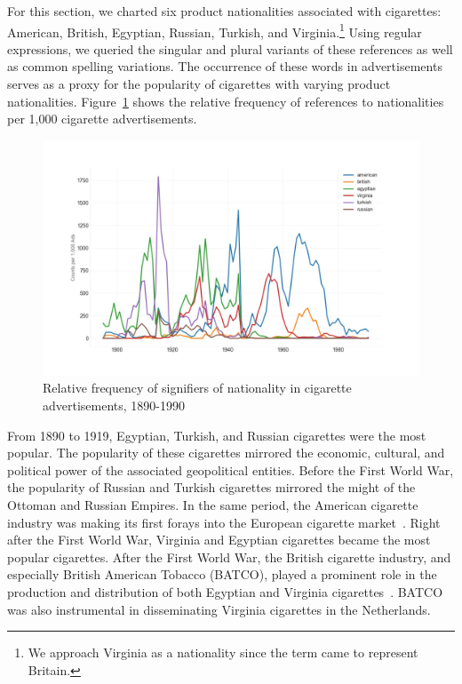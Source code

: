\documentclass[USenglish]{article}
\begin{document}
For this section, we charted six product nationalities associated with cigarettes: American, British, Egyptian, Russian, Turkish, and Virginia.\footnote{We approach Virginia as a nationality since the term came to represent Britain.} Using regular expressions, we queried the singular and plural variants of these references as well as common spelling variations. The occurrence of these words in advertisements serves as a proxy for the popularity of cigarettes with varying product nationalities. Figure~\ref{fig:cig_nationality} shows the relative frequency of references to nationalities per 1,000 cigarette advertisements. 

\begin{figure}%
  \centering
  \includegraphics[width=\textwidth]{figures/cigarette_nationality}%
  \caption{Relative frequency of signifiers of nationality in cigarette advertisements, 1890-1990}%
  \label{fig:cig_nationality}%
\end{figure}
 

From 1890 to 1919, Egyptian, Turkish, and Russian cigarettes were the most popular. The popularity of these cigarettes mirrored the economic, cultural, and political power of the associated geopolitical entities. Before the First World War, the popularity of Russian and Turkish cigarettes mirrored the might of the Ottoman and Russian Empires. In the same period, the American cigarette industry was making its first forays into the European cigarette market~\cite{brandt_cigarette_2009}.
%
Right after the First World War, Virginia and Egyptian cigarettes became the most popular cigarettes. After the First World War, the British cigarette industry, and especially British American Tobacco (BATCO), played a prominent role in the production and distribution of both Egyptian and Virginia cigarettes~\cite[27-8]{shechter_smoking_2006}. BATCO was also instrumental in disseminating Virginia cigarettes in the Netherlands.
\end{document}
